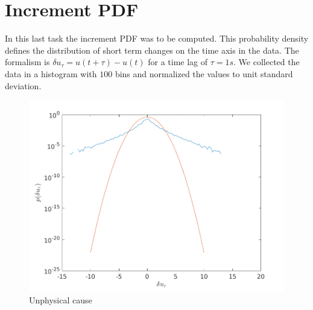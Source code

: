 \documentclass[10pt]{article}
\begin{document}
\section{Increment PDF}
In this last task the increment PDF was to be computed. This probability density defines the distribution of short term changes on the time axis in the data. The formalism is $\delta u_{\tau} = u(t+\tau)-u(t)$ for a time lag of $\tau=1s$. We collected the data in a histogram with $100$ bins and normalized the values to unit standard deviation.
\begin{figure}[htb!]
  \centering
  \includegraphics[width=1\linewidth]{../Plots/tau_pdf_gauss10.png}
  \caption{Unphysical cause}
  \label{fig:incrementPdf}
\end{figure}
\end{document}
